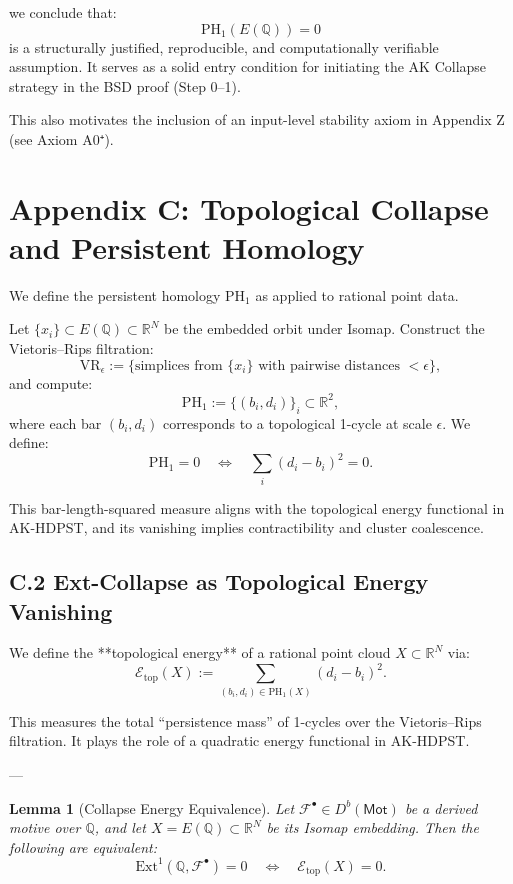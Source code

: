 \documentclass[11pt]{article}
\newtheorem{lemma}[theorem]{Lemma}
\theoremstyle{definition}
\begin{document}
we conclude that:
\[
\mathrm{PH}_1(E(\mathbb{Q})) = 0
\]
is a structurally justified, reproducible, and computationally verifiable assumption.  
It serves as a solid entry condition for initiating the AK Collapse strategy in the BSD proof (Step 0–1).

This also motivates the inclusion of an input-level stability axiom in Appendix Z (see Axiom A0⁺).



\section*{Appendix C: Topological Collapse and Persistent Homology}

We define the persistent homology \( \mathrm{PH}_1 \) as applied to rational point data.

Let \( \{x_i\} \subset E(\mathbb{Q}) \subset \mathbb{R}^N \) be the embedded orbit under Isomap.  
Construct the Vietoris–Rips filtration:
\[
\mathrm{VR}_\epsilon := \{ \text{simplices from } \{x_i\} \text{ with pairwise distances } < \epsilon \},
\]
and compute:
\[
\mathrm{PH}_1 := \{ (b_i, d_i) \}_{i} \subset \mathbb{R}^2,
\]
where each bar \( (b_i, d_i) \) corresponds to a topological 1-cycle at scale \( \epsilon \).  
We define:
\[
\mathrm{PH}_1 = 0 \quad \Leftrightarrow \quad \sum_i (d_i - b_i)^2 = 0.
\]

This bar-length-squared measure aligns with the topological energy functional in AK-HDPST, and its vanishing implies contractibility and cluster coalescence.

\subsection*{C.2 Ext-Collapse as Topological Energy Vanishing}

We define the **topological energy** of a rational point cloud \( X \subset \mathbb{R}^N \) via:
\[
\mathcal{E}_{\text{top}}(X) := \sum_{(b_i, d_i) \in \mathrm{PH}_1(X)} (d_i - b_i)^2.
\]

This measures the total “persistence mass” of 1-cycles over the Vietoris–Rips filtration.  
It plays the role of a quadratic energy functional in AK-HDPST.

---

\begin{lemma}[Collapse Energy Equivalence]
Let \( \mathcal{F}^\bullet \in D^b(\mathsf{Mot}) \) be a derived motive over \( \mathbb{Q} \),  
and let \( X = E(\mathbb{Q}) \subset \mathbb{R}^N \) be its Isomap embedding.  
Then the following are equivalent:
\[
\mathrm{Ext}^1(\mathbb{Q}, \mathcal{F}^\bullet) = 0 \quad \Leftrightarrow \quad \mathcal{E}_{\text{top}}(X) = 0.
\]
\end{lemma}
\end{document}

